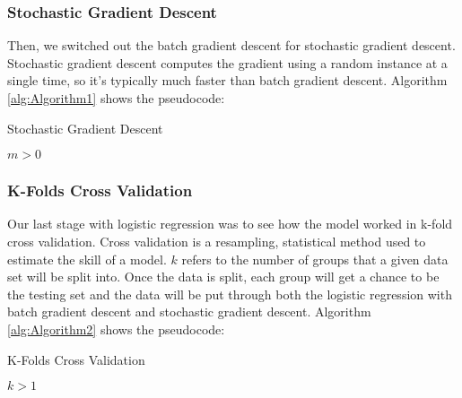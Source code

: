 \subsubsection{Stochastic Gradient Descent}
\label{sec:methods:Logistic Regression Model:Stochastic Gradient Descent}

Then, we switched out the batch gradient descent for stochastic gradient descent. Stochastic gradient descent computes the gradient using a random instance at a single time, so it’s typically much faster than batch gradient descent. Algorithm \eqref{alg:Algorithm1} shows the pseudocode:

\begin{algorithm}
    \caption{Stochastic Gradient Descent}
    \label{alg:Algorithm1}
    \begin{algorithmic}[1]
        \ENSURE $m > 0$
        \ENDFOR
    \end{algorithmic}
\end{algorithm}

\subsubsection{K-Folds Cross Validation}
\label{sec:methods:Logistic Regression Model:K-Folds Cross Validation}

Our last stage with logistic regression was to see how the model worked in k-fold cross validation. Cross validation is a resampling, statistical method used to estimate the skill of a model. $k$ refers to the number of groups that a given data set will be split into. Once the data is split, each group will get a chance to be the testing set and the data will be put through both the logistic regression with batch gradient descent and stochastic gradient descent. Algorithm \eqref{alg:Algorithm2} shows the pseudocode:

\begin{algorithm}
    \caption{K-Folds Cross Validation}
    \label{alg:Algorithm2}
    \begin{algorithmic}[2]
        \ENSURE $k > 1$
        \ENDFOR
    \end{algorithmic}
\end{algorithm}


